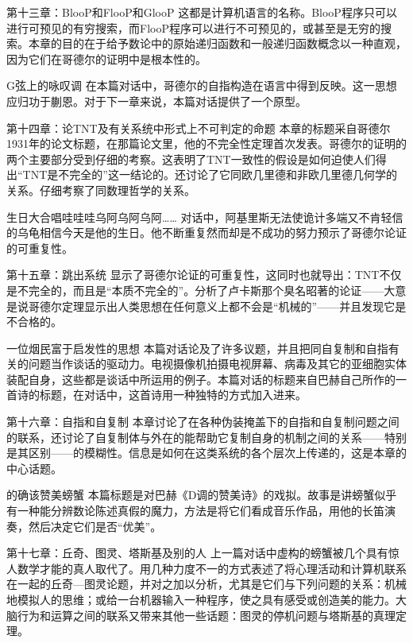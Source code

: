 \begin{overview}
\item[第十三章：BlooP和FlooP和GlooP]这都是计算机语言的名称。BlooP程序只可以进行可预见的有穷搜索，而FlooP程序可以进行不可预见的，或甚至是无穷的搜索。本章的目的在于给予数论中的原始递归函数和一般递归函数概念以一种直观，因为它们在哥德尔的证明中是根本性的。

\item[G弦上的咏叹调]在本篇对话中，哥德尔的自指构造在语言中得到反映。这一思想应归功于蒯恩。对于下一章来说，本篇对话提供了一个原型。

\item[第十四章：论TNT及有关系统中形式上不可判定的命题]本章的标题采自哥德尔1931年的论文标题，在那篇论文里，他的不完全性定理首次发表。哥德尔的证明的两个主要部分受到仔细的考察。这表明了TNT一致性的假设是如何迫使人们得出“TNT是不完全的”这一结论的。还讨论了它同欧几里德和非欧几里德几何学的关系。仔细考察了同数理哲学的关系。

\item[生日大合唱哇哇哇乌阿乌阿乌阿……]对话中，阿基里斯无法使诡计多端又不肯轻信的乌龟相信今天是他的生日。他不断重复然而却是不成功的努力预示了哥德尔论证的可重复性。

\item[第十五章：跳出系统]显示了哥德尔论证的可重复性，这同时也就导出：TNT不仅是不完全的，而且是“本质不完全的”。分析了卢卡斯那个臭名昭著的论证——大意是说哥德尔定理显示出人类思想在任何意义上都不会是“机械的”——并且发现它是不合格的。

\item[一位烟民富于启发性的思想]本篇对话论及了许多议题，并且把同自复制和自指有关的问题当作谈话的驱动力。电视摄像机拍摄电视屏幕、病毒及其它的亚细胞实体装配自身，这些都是谈话中所运用的例子。本篇对话的标题来自巴赫自己所作的一首诗的标题，在对话中，这首诗用一种独特的方式加入进来。

\item[第十六章：自指和自复制]本章讨论了在各种伪装掩盖下的自指和自复制问题之间的联系，还讨论了自复制体与外在的能帮助它复制自身的机制之间的关系——特别是其区别——的模糊性。信息是如何在这类系统的各个层次上传递的，这是本章的中心话题。

\item[的确该赞美螃蟹]本篇标题是对巴赫《D调的赞美诗》的戏拟。故事是讲螃蟹似乎有一种能分辨数论陈述真假的魔力，方法是将它们看成音乐作品，用他的长笛演奏，然后决定它们是否“优美”。

\item[第十七章：丘奇、图灵、塔斯基及别的人]上一篇对话中虚构的螃蟹被几个具有惊人数学才能的真人取代了。用几种力度不一的方式表述了将心理活动和计算机联系在一起的丘奇—图灵论题，并对之加以分析，尤其是它们与下列问题的关系：机械地模拟人的思维；或给一台机器输入一种程序，使之具有感受或创造美的能力。大脑行为和运算之间的联系又带来其他一些话题：图灵的停机问题与塔斯基的真理定理。


\end{overview}
